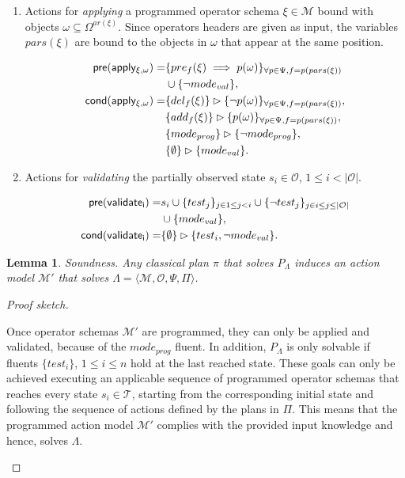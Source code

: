 \documentclass[letterpaper]{article} %
\newcommand{\tup}[1]{{\langle #1 \rangle}}
\newcommand{\pre}{\mathsf{pre}}     %
\newcommand{\cond}{\mathsf{cond}}   %
\newtheorem{lemma}[theorem]{Lemma}
\begin{document}
\begin{itemize}
\begin{enumerate}
\item Actions for {\em applying} a programmed operator schema $\xi\in\mathcal{M}$ bound with objects $\omega\subseteq\Omega^{ar(\xi)}$. Since operators headers are given as input, the variables $pars(\xi)$ are bound to the objects in $\omega$ that appear at the same position. 
\begin{small}
\begin{align*}
\hspace*{7pt}\pre(\mathsf{apply_{\xi,\omega}})=&\{pre_{f}(\xi)\implies p(\omega)\}_{\forall p\in\Psi,f=p(pars(\xi))}\\
&\cup \{\neg mode_{val}\},\\
\cond(\mathsf{apply_{\xi,\omega}})=&\{del_{f}(\xi)\}\rhd\{\neg p(\omega)\}_{\forall p\in\Psi,f=p(pars(\xi))},\\
&\{add_{f}(\xi)\}\rhd\{p(\omega)\}_{\forall p\in\Psi,f=p(pars(\xi))},\\
&\{mode_{prog}\}\rhd\{\neg mode_{prog}\},\\
&\{\emptyset\}\rhd\{mode_{val}\}.
\end{align*}
\end{small}

\item Actions for {\em validating} the partially observed state $s_i\in\mathcal{O}$, {\tt\small $1\leq i< |\mathcal{O}|$}.
\begin{small}
\begin{align*}
\hspace*{7pt}\pre(\mathsf{validate_{i}})=&s_i\cup\{test_j\}_{j\in 1\leq j<i}\cup\{\neg test_j\}_{j\in i\leq j\leq |\mathcal{O}|}\\
& \cup \{mode_{val}\},\\
\cond(\mathsf{validate_{i}})=&\{\emptyset\}\rhd\{test_i,\neg mode_{val}\}.
\end{align*}
\end{small}
\end{enumerate}
\end{itemize}


\begin{lemma}
Soundness. Any classical plan $\pi$ that solves $P_{\Lambda}$ induces an action model $\mathcal{M}'$ that solves $\Lambda=\tup{\mathcal{M},\mathcal{O},\Psi,\Pi}$.
\end{lemma}

\begin{proof}[Proof sketch]
\begin{small}
Once operator schemas $\mathcal{M}'$ are programmed, they can only be applied and validated, because of the $mode_{prog}$ fluent. In addition, $P_{\Lambda}$ is only solvable if fluents $\{test_i\}$, {\small $1\leq i\leq n$} hold at the last reached state. These goals can only be achieved executing an applicable sequence of programmed operator schemas that reaches every state $s_i\in\mathcal{T}$, starting from the corresponding initial state and following the sequence of actions defined by the plans in $\Pi$. This means that the programmed action model $\mathcal{M}'$ complies with the provided input knowledge and hence, solves $\Lambda$.
\end{small}
\end{proof}
\end{document}
